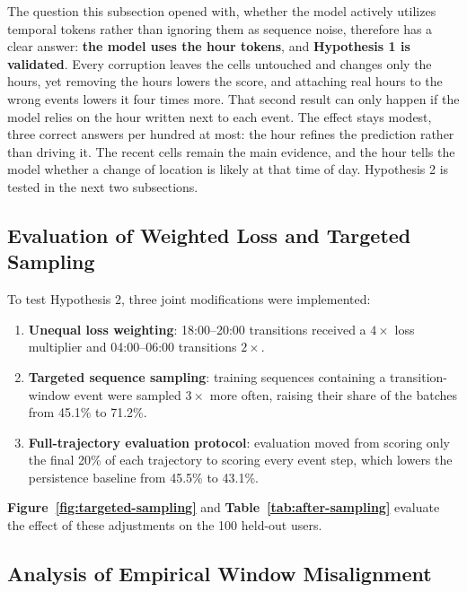 

The question this subsection opened with, whether the model actively utilizes temporal tokens rather than ignoring them as sequence noise, therefore has a clear answer: \textbf{the model uses the hour tokens}, and \textbf{Hypothesis 1 is validated}. Every corruption leaves the cells untouched and changes only the hours, yet removing the hours lowers the score, and attaching real hours to the wrong events lowers it four times more. That second result can only happen if the model relies on the hour written next to each event. The effect stays modest, three correct answers per hundred at most: the hour refines the prediction rather than driving it. The recent cells remain the main evidence, and the hour tells the model whether a change of location is likely at that time of day. Hypothesis 2 is tested in the next two subsections.

\subsection{Evaluation of Weighted Loss and Targeted Sampling}

To test Hypothesis 2, three joint modifications were implemented:
\begin{enumerate}
  \item \textbf{Unequal loss weighting}: 18:00--20:00 transitions received a $4\times$ loss multiplier and 04:00--06:00 transitions $2\times$.
  \item \textbf{Targeted sequence sampling}: training sequences containing a transition-window event were sampled $3\times$ more often, raising their share of the batches from 45.1\% to 71.2\%.
  \item \textbf{Full-trajectory evaluation protocol}: evaluation moved from scoring only the final 20\% of each trajectory to scoring every event step, which lowers the persistence baseline from 45.5\% to 43.1\%.
\end{enumerate}

\textbf{Figure~\ref{fig:targeted-sampling}} and \textbf{Table~\ref{tab:after-sampling}} evaluate the effect of these adjustments on the 100 held-out users.





\subsection{Analysis of Empirical Window Misalignment}

